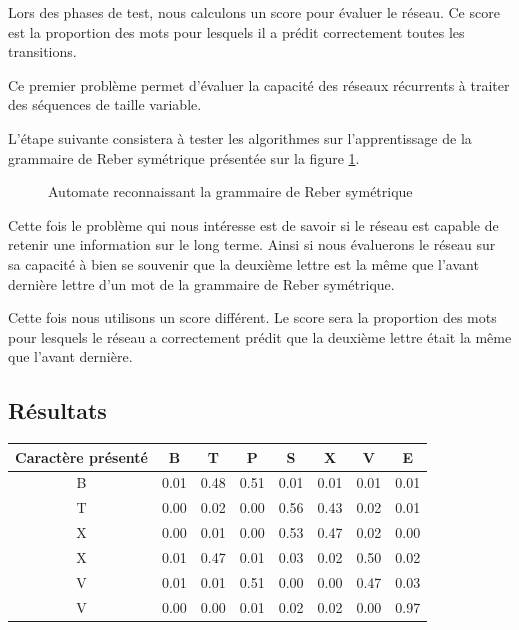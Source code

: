Lors des phases de test, nous calculons un score pour évaluer le réseau. Ce score est la proportion des mots pour lesquels il a prédit correctement toutes les transitions.

Ce premier problème permet d'évaluer la capacité des réseaux récurrents à traiter des séquences de taille variable.

L'étape suivante consistera à tester les algorithmes sur l'apprentissage de la grammaire de Reber symétrique présentée sur la figure \ref{Grammaire de Reber symétrique}.  
\begin{figure}[h!]
\begin{center}

\caption{Automate reconnaissant la grammaire de Reber symétrique}
\label{Grammaire de Reber symétrique}
\end{center}
\end{figure}

Cette fois le problème qui nous intéresse est de savoir si le réseau est capable de retenir une information sur le long terme. Ainsi si nous évaluerons le réseau sur sa capacité à bien se souvenir que la deuxième lettre est la même que l'avant dernière lettre d'un mot de la grammaire de Reber symétrique.

Cette fois nous utilisons un score différent. Le score sera la proportion des mots pour lesquels le réseau a correctement prédit que la deuxième lettre était la même que l'avant dernière.

\subsection{Résultats}

\begin{center}
\begin{tabular}{|c|c|c|c|c|c|c|c|}
\hline
Caractère présenté & B & T & P & S & X & V & E \\
\hline
B & 0.01 & 0.48 & 0.51 & 0.01 & 0.01 & 0.01 & 0.01 \\
\hline
T & 0.00 & 0.02 & 0.00 & 0.56 & 0.43 & 0.02 & 0.01 \\
\hline
X & 0.00 & 0.01 & 0.00 & 0.53 & 0.47 & 0.02 & 0.00 \\
\hline
X & 0.01 & 0.47 & 0.01 & 0.03 & 0.02 & 0.50 & 0.02 \\
\hline
V & 0.01 & 0.01 & 0.51 & 0.00 & 0.00 & 0.47 & 0.03 \\
\hline
V & 0.00 & 0.00 & 0.01 & 0.02 & 0.02 & 0.00 & 0.97 \\
\hline
\end{tabular}
\end{center}

